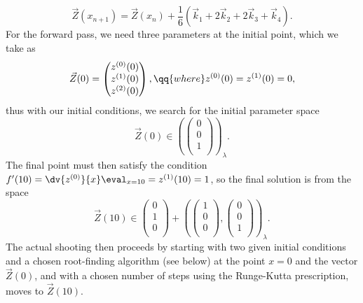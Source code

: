 \begin{example}
\begin{equation}
		\vec{Z}(x_{n+1}) = \vec{Z}(x_{n}) + \frac{1}{6}  \left(\vec{k}_{1} +  2\vec{k}_{2} + 2\vec{k}_{3} + \vec{k}_{4} \right).
	\end{equation}
	For the forward pass, we need three parameters at the initial point, which we take as
	\begin{equation}
		\vec{Z}(0) =
		\begin{pmatrix}
			z^{(0)}(0) \\
			z^{(1)}(0) \\
			z^{(2)}(0)
		\end{pmatrix},  \qq{where} z^{(0)}(0) = z^{(1)}(0) = 0,
	\end{equation}
	thus with our initial conditions, we search for the initial parameter space
	\begin{equation}
		\vec{Z}(0) \in \left(
		\begin{pmatrix}
			0 \\
			0 \\
			1 \\
		\end{pmatrix}
		\right)_{\lambda}.
	\end{equation}
	The final point must then satisfy the condition $f'(10) = \dv{z^{(0)}}{x}\eval_{x=10} = z^{(1)}(10) = 1$, so the final solution is from the space
	\begin{equation}
		\vec{Z}(10) \in
		\begin{pmatrix}
			0 \\
			1 \\
			0 \\
		\end{pmatrix}  +
		\left(
		\begin{pmatrix}
			1 \\
			0 \\
			0 \\
		\end{pmatrix},
		\begin{pmatrix}
			0 \\
			0 \\
			1 \\
		\end{pmatrix}
		\right)_{\lambda}.
	\end{equation}
	The actual shooting then proceeds by starting with two given initial conditions and a chosen root-finding algorithm (see below) at the point $x = 0$ and the vector $\vec{Z}(0)$, and with a chosen number of steps using the Runge-Kutta prescription, moves to $\vec{Z}(10)$.


\end{example}
